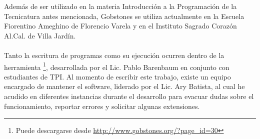 Además de ser utilizado en la materia Introducción a la Programación de la Tecnicatura antes mencionada, Gobstones se utiliza actualmente en la Escuela Fiorentino Ameghino de Florencio Varela y en el Instituto Sagrado Corazón Al.Cal. de Villa Jardín.
\\\\
Tanto la escritura de programas como su ejecución ocurren dentro de la herramienta \footnote{Puede descargarse desde \url{http://www.gobstones.org/?page_id=30}}, desarrollada por el Lic. Pablo Barenbaum en conjunto con estudiantes de TPI. Al momento de escribir este trabajo, existe un equipo encargado de mantener el software, liderado por el Lic. Ary Batista, al cual he acudido en diferentes instancias durante el desarrollo para evacuar dudas sobre el funcionamiento, reportar errores y solicitar algunas extensiones.

